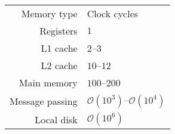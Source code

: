 \bgroup{}
\begin{tabular}{rl}
  \hline
  Memory type & Clock cycles \\ \hhline{==}
  Registers & $1$ \\ \hline
  L1 cache & $2$--$3$ \\ \hline
  L2 cache & $10$--$12$ \\ \hline
  Main memory &  $100$--$200$ \\ \hline
  Message passing & $\mathcal{O}(10^3)$--$\mathcal{O}(10^4)$ \\ \hline
  Local disk & $\mathcal{O}(10^6)$ \\ \hline
\end{tabular}
\egroup
